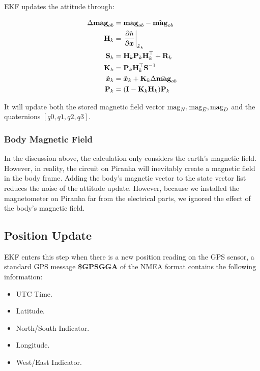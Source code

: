 EKF updates the attitude through:

\begin{align}
    \Delta \textbf{mag}_{ob} & =\textbf{mag}_{ob}-\Tilde{\textbf{mag}}_{ob} \\
    \textbf{H}_k &=\left.\frac{\partial h}{\partial \boldsymbol{x}}\right|_{\Tilde{x}_k} \\
    \textbf{S}_k &=\textbf{H}_k\textbf{P}_k\textbf{H}_k^\top+\textbf{R}_k \\
    \textbf{K}_k &=\textbf{P}_k\textbf{H}_k^\top\textbf{S}^{-1} \\
    \Tilde{\boldsymbol{x}}_k &=\Tilde{\boldsymbol{x}}_k+\textbf{K}_k\Delta\Tilde{\textbf{mag}}_{ob} \\
    \textbf{P}_k &=(\textbf{I}-\textbf{K}_k\textbf{H}_k)\textbf{P}_k
\end{align}

It will update both the stored magnetic field vector ${\rm mag}_N, {\rm mag}_E, {\rm mag}_D$ and the quaternions $[q0, q1, q2, q3]$.

\subsubsection{Body Magnetic Field}

In the discussion above, the calculation only considers the earth's magnetic field. However, in reality, the circuit on Piranha will inevitably create a magnetic field in the body frame. Adding the body's magnetic vector to the state vector list reduces the noise of the attitude update. However, because we installed the magnetometer on Piranha far from the electrical parts, we ignored the effect of the body's magnetic field. 


\subsection{Position Update}

EKF enters this step when there is a new position reading on the GPS sensor, a standard GPS message \textbf{\$GPSGGA} of the NMEA format contains the following information:

\begin{itemize}
    \item UTC Time.
    \item Latitude.
    \item North/South Indicator.
    \item Longitude.
    \item West/East Indicator.
\end{itemize}

